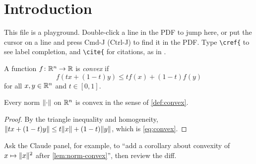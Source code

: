 \section{Introduction}\label{sec:intro}

This file is a playground. Double-click a line in the PDF to jump here, or put
the cursor on a line and press Cmd-J (Ctrl-J) to find it in the PDF.
Type \verb|\cref{| to see label completion, and \verb|\cite{| for citations,
as in \cite{Knuth1984}.

\begin{definition}\label{def:convex}
  A function $f\colon \mathbb{R}^n \to \mathbb{R}$ is \emph{convex} if
  \begin{equation}\label{eq:convex}
    f(t x + (1-t) y) \le t f(x) + (1-t) f(y)
  \end{equation}
  for all $x, y \in \mathbb{R}^n$ and $t \in [0,1]$.
\end{definition}

\begin{lemma}\label{lem:norm-convex}
  Every norm $\lVert \cdot \rVert$ on $\mathbb{R}^n$ is convex in the sense of \cref{def:convex}.
\end{lemma}

\begin{proof}
  By the triangle inequality and homogeneity,
  $\lVert t x + (1-t) y \rVert \le t\lVert x \rVert + (1-t)\lVert y \rVert$, which is \eqref{eq:convex}.
\end{proof}

\begin{remark}
  Ask the Claude panel, for example, to ``add a corollary about convexity of
  $x \mapsto \lVert x \rVert^2$ after \cref{lem:norm-convex}'', then review the diff.
\end{remark}
